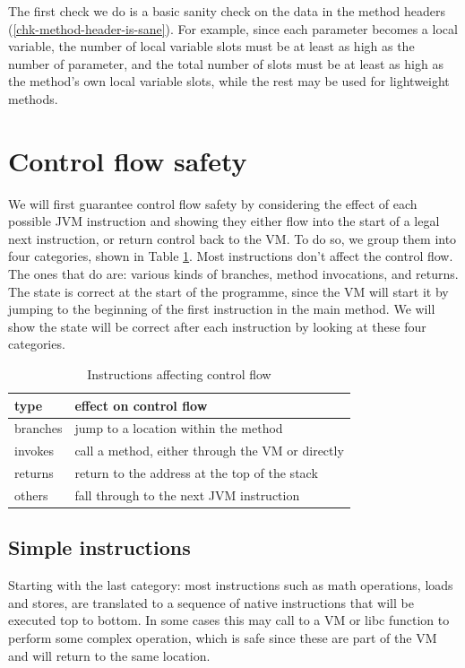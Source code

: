The first check we do is a basic sanity check on the data in the method headers (\ref{chk-method-header-is-sane}). For example, since each parameter becomes a local variable, the number of local variable slots must be at least as high as the number of parameter, and the total number of slots must be at least as high as the method's own local variable slots, while the rest may be used for lightweight methods.

\section{Control flow safety}
We will first guarantee control flow safety by considering the effect of each possible JVM instruction and showing they either flow into the start of a legal next instruction, or return control back to the VM. To do so, we group them into four categories, shown in Table \ref{tbl-control-flow-instructions}. Most instructions don't affect the control flow. The ones that do are: various kinds of branches, method invocations, and returns. The state is correct at the start of the programme, since the VM will start it by jumping to the beginning of the first instruction in the main method. We will show the state will be correct after each instruction by looking at these four categories.

\begin{table}[H]
\centering
\caption{Instructions affecting control flow}
\label{tbl-control-flow-instructions}
\begin{tabular}{ll}
\toprule
type     & effect on control flow \\
\midrule
branches & jump to a location within the method \\
invokes  & call a method, either through the VM or directly \\
returns  & return to the address at the top of the stack \\
others   & fall through to the next JVM instruction \\
\bottomrule
\end{tabular}
\end{table}

\subsection{Simple instructions}
Starting with the last category: most instructions such as math operations, loads and stores, are translated to a sequence of native instructions that will be executed top to bottom. In some cases this may call to a VM or libc function to perform some complex operation, which is safe since these are part of the VM and will return to the same location.

